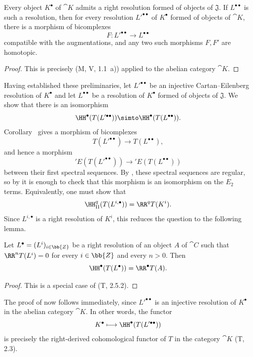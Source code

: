 \begin{corollary}[11.5.2.2]
\label{0.11.5.2.2}
Every object $K^\bullet$ of $\cat{K}$ admits a right resolution formed of objects of $\mathfrak{J}$.
If $L^{\bullet\bullet}$ is such a resolution, then for every resolution $L'^{\bullet\bullet}$ of $K^\bullet$ formed of objects of $\cat{K}$, there is a morphism of bicomplexes
\[
  F:L'^{\bullet\bullet}\longrightarrow L^{\bullet\bullet}
\]
compatible with the augmentations, and any two such morphisms $F,F'$ are homotopic.
\end{corollary}

\begin{proof}
This is precisely (M, V, 1.1~a)) applied to the abelian category $\cat{K}$.
\end{proof}

\begin{env}[11.5.2.3]
\label{0.11.5.2.3}
Having established these preliminaries, let $L'^{\bullet\bullet}$ be an injective Cartan--Eilenberg resolution of $K^\bullet$ and let $L^{\bullet\bullet}$ be a resolution of $K^\bullet$ formed of objects of $\mathfrak{J}$.
We show that there is an isomorphism
\[
  \HH^\bullet(T(L'^{\bullet\bullet}))
  \simto
  \HH^\bullet(T(L^{\bullet\bullet})).
\]
Corollary~ gives a morphism of bicomplexes
\[
  T(L'^{\bullet\bullet})\longrightarrow T(L^{\bullet\bullet}),
\]
and hence a morphism
\[
  'E(T(L'^{\bullet\bullet}))\longrightarrow{}'E(T(L^{\bullet\bullet}))
\]
between their first spectral sequences.
By , these spectral sequences are regular, so by  it is enough to check that this morphism is an isomorphism on the $E_2$ terms.
Equivalently, one must show that
\[
  \HH_\mathrm{II}^q(T(L^{i,\bullet}))=\RR^qT(K^i).
\]
Since $L^{i,\bullet}$ is a right resolution of $K^i$, this reduces the question to the following lemma.
\end{env}

\begin{lemma}[11.5.2.4]
\label{0.11.5.2.4}
Let $L^\bullet=(L^i)_{i\in\bb{Z}}$ be a right resolution of an object $A$ of $\cat{C}$ such that $\RR^nT(L^i)=0$ for every $i\in\bb{Z}$ and every $n>0$.
Then
\[
  \HH^\bullet(T(L^\bullet))=\RR^\bullet T(A).
\]
\end{lemma}

\begin{proof}
This is a special case of (T, 2.5.2).
\end{proof}

\begin{env}[11.5.2.5]
\label{0.11.5.2.5}
The proof of  now follows immediately, since $L'^{\bullet\bullet}$ is an injective resolution of $K^\bullet$ in the abelian category $\cat{K}$.
In other words, the functor
\[
  K^\bullet\longmapsto\HH^\bullet(T(L'^{\bullet\bullet}))
\]
is precisely the right-derived cohomological functor of $T$ in the category $\cat{K}$ (T, 2.3).
\end{env}

